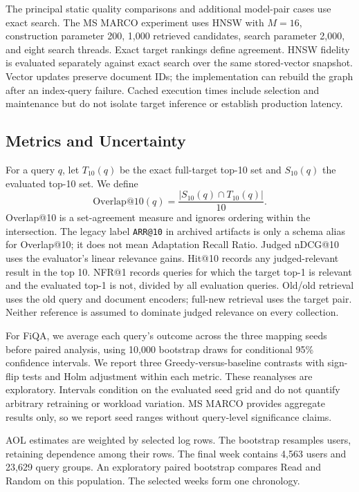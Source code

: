 \documentclass[runningheads]{llncs}
\begin{document}
The principal static quality comparisons and additional model-pair cases use exact search. The MS MARCO experiment uses HNSW with $M=16$, construction parameter 200, 1,000 retrieved candidates, search parameter 2,000, and eight search threads. Exact target rankings define agreement. HNSW fidelity is evaluated separately against exact search over the same stored-vector snapshot. Vector updates preserve document IDs; the implementation can rebuild the graph after an index-query failure. Cached execution times include selection and maintenance but do not isolate target inference or establish production latency.

\subsection{Metrics and Uncertainty}

For a query $q$, let $T_{10}(q)$ be the exact full-target top-10 set and $S_{10}(q)$ the evaluated top-10 set. We define
\begin{equation}
 \mathrm{Overlap@10}(q)=\frac{|S_{10}(q)\cap T_{10}(q)|}{10}.
\end{equation}
Overlap@10 is a set-agreement measure and ignores ordering within the intersection. The legacy label \texttt{ARR@10} in archived artifacts is only a schema alias for Overlap@10; it does not mean Adaptation Recall Ratio. Judged nDCG@10 uses the evaluator's linear relevance gains. Hit@10 records any judged-relevant result in the top 10. NFR@1 records queries for which the target top-1 is relevant and the evaluated top-1 is not, divided by all evaluation queries. Old/old retrieval uses the old query and document encoders; full-new retrieval uses the target pair. Neither reference is assumed to dominate judged relevance on every collection.

For FiQA, we average each query's outcome across the three mapping seeds before paired analysis, using 10,000 bootstrap draws for conditional 95\% confidence intervals. We report three Greedy-versus-baseline contrasts with sign-flip tests and Holm adjustment within each metric. These reanalyses are exploratory. Intervals condition on the evaluated seed grid and do not quantify arbitrary retraining or workload variation. MS MARCO provides aggregate results only, so we report seed ranges without query-level significance claims.

AOL estimates are weighted by selected log rows. The bootstrap resamples users, retaining dependence among their rows. The final week contains 4,563 users and 23,629 query groups. An exploratory paired bootstrap compares Read and Random on this population. The selected weeks form one chronology.
\end{document}
